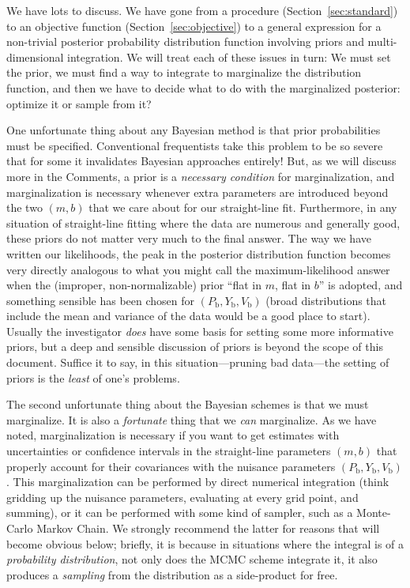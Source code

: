 \documentclass[12pt,twoside]{article}
\newcommand{\documentname}{document}
\newcommand{\sectionname}{Section}
\newcommand{\commentsname}{Comments}
\newcounter{problem}
\newcommand{\Pbad}{P_{\mathrm{b}}}
\newcommand{\Ybad}{Y_{\mathrm{b}}}
\newcommand{\Vbad}{V_{\mathrm{b}}}
\begin{document}
We have lots to discuss.  We have gone from a procedure
(\sectionname~\ref{sec:standard}) to an objective function
(\sectionname~\ref{sec:objective}) to a general expression for a
non-trivial posterior probability distribution function involving
priors and multi-dimensional integration.  We will treat each of
these issues in turn: We must set the prior, we must find a way to
integrate to marginalize the distribution function, and then we have
to decide what to do with the marginalized posterior: optimize it or
sample from it?

One unfortunate thing about any Bayes\-ian method is that prior
probabilities must be specified.  Conventional frequentists take this
problem to be so severe that for some it invalidates Bayesian
approaches entirely!  But, as we will discuss more in the
\commentsname, a prior is a \emph{necessary condition} for
marginalization, and marginalization is necessary whenever extra
parameters are introduced beyond the two $(m,b)$ that we care about
for our straight-line fit.  Furthermore, in any situation of
straight-line fitting where the data are numerous and generally good,
these priors do not matter very much to the final answer.  The way we
have written our likelihoods, the peak in the posterior distribution
function becomes very directly analogous to what you might call the
maximum-likelihood answer when the (improper, non-normalizable) prior
``flat in $m$, flat in $b$'' is adopted, and something sensible has
been chosen for $(\Pbad,\Ybad,\Vbad)$ (broad distributions that
include the mean and variance of the data would be a good place to
start).  Usually the investigator \emph{does} have some basis for
setting some more informative priors, but a deep and sensible
discussion of priors is beyond the scope of this \documentname.
Suffice it to say, in this situation---pruning bad data---the setting
of priors is the \emph{least} of one's problems.

The second unfortunate thing about the Bayesian schemes is that we
must marginalize.  It is also a \emph{fortunate} thing that we
\emph{can} marginalize.  As we have noted, marginalization is
necessary if you want to get estimates with uncertainties or
confidence intervals in the straight-line parameters $(m,b)$ that
properly account for their covariances with the nuisance parameters
$(\Pbad,\Ybad,\Vbad)$.  This marginalization can be performed by
direct numerical integration (think gridding up the nuisance
parameters, evaluating at every grid point, and summing), or it can be
performed with some kind of sampler, such as a Monte-Carlo Markov
Chain.  We strongly recommend the latter for reasons that will become
obvious below; briefly, it is because in situations where the integral
is of a \emph{probability distribution}, not only does the MCMC scheme
integrate it, it also produces a \emph{sampling} from the distribution
as a side-product for free.
\end{document}
